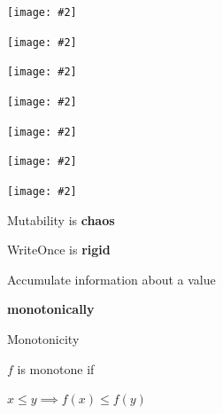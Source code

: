 \documentclass[UKenglish,usenames,dvipsnames,svgnames,table,aspectratio=169,mathserif]{beamer}
\newcommand{\nl}{\vspace{\baselineskip}}
\newcommand{\pnl}{\pause \nl}
\newcommand{\imageslide}[2][1]{{
\begin{frame}\begin{center}
\texttt{[image: \#2]}
\end{center}\end{frame}
}}
\begin{document}
\imageslide{oscillator-fixed1.pdf}
\imageslide{oscillator-fixed2.pdf}
\imageslide{oscillator-fixed3.pdf}
\imageslide{oscillator-fixed4.pdf}
\imageslide{oscillator-fixed5.pdf}
\imageslide{oscillator-fixed6.pdf}
\imageslide{oscillator-fixed7.pdf}


\begin{frame}

\centering \LARGE

Mutability is {\bf chaos}

\nl
WriteOnce is {\bf rigid}
\end{frame}


\begin{frame}[fragile]

\LARGE
\begin{center}
Accumulate information about a value

\pnl

{\bf monotonically}
\end{center}
\end{frame}


\begin{frame}

\centering \huge
Monotonicity
\nl

\Large
$f$ is monotone if\\
\nl

$ x \leq y \implies f(x) \leq f(y)$

\end{frame}



\end{document}
